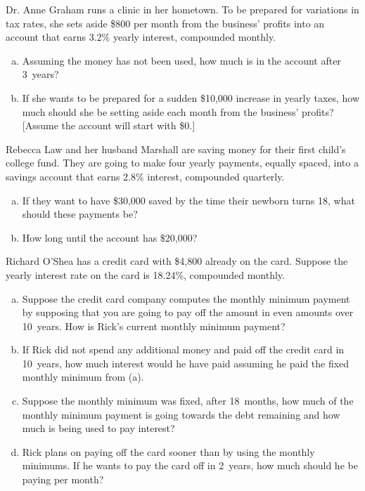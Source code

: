 \documentclass[11pt,letterpaper]{article}
\begin{document}

 Dr. Anne Graham runs a clinic in her hometown. To be prepared for variations in tax rates, she sets aside \$800 per month from the business' profits into an account that earns 3.2\% yearly interest, compounded monthly. 
\begin{enumerate}[(a)]
\item Assuming the money has not been used, how much is in the account after 3~years?
\item If she wants to be prepared for a sudden \$10,000 increase in yearly taxes, how much should she be setting aside each month from the business' profits? [Assume the account will start with \$0.]
\end{enumerate}





\newpage





 Rebecca Law and her husband Marshall are saving money for their first child's college fund. They are going to make four yearly payments, equally spaced, into a savings account that earns 2.8\% interest, compounded quarterly. 
\begin{enumerate}[(a)]
\item If they want to have \$30,000 saved by the time their newborn turns 18, what should these payments be?
\item How long until the account has \$20,000?
\end{enumerate}





\newpage





 Richard O'Shea has a credit card with \$4,800 already on the card. Suppose the yearly interest rate on the card is 18.24\%, compounded monthly. 
\begin{enumerate}[(a)]
\item Suppose the credit card company computes the monthly minimum payment by supposing that you are going to pay off the amount in even amounts over 10~years. How is Rick's current monthly minimum payment?
\item If Rick did not spend any additional money and paid off the credit card in 10~years, how much interest would he have paid assuming he paid the fixed monthly minimum from (a).
\item Suppose the monthly minimum was fixed, after 18~months, how much of the monthly minimum payment is going towards the debt remaining and how much is being used to pay interest?
\item Rick plans on paying off the card sooner than by using the monthly minimums. If he wants to pay the card off in 2~years, how much should he be paying per month?
\end{enumerate}
\end{document}

